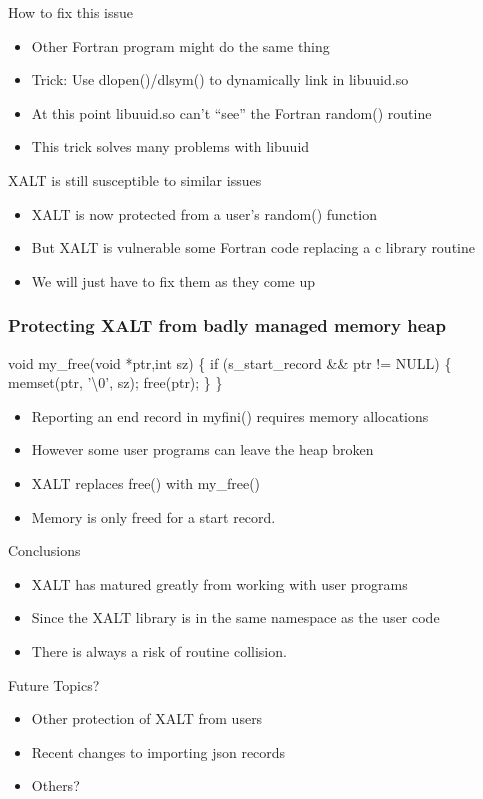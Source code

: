 \documentclass{beamer}
\begin{document}
\begin{frame}{How to fix this issue}
  \begin{itemize}
    \item Other Fortran program might do the same thing
    \item Trick: Use dlopen()/dlsym() to dynamically link in libuuid.so
    \item At this point libuuid.so can't ``see'' the Fortran random()
      routine
    \item This trick solves many problems with libuuid
  \end{itemize}
\end{frame}

\begin{frame}{XALT is still susceptible to similar issues}
  \begin{itemize}
    \item XALT is now protected from a user's random() function
    \item But XALT is vulnerable some Fortran code replacing a c
      library routine
    \item We will just have to fix them as they come up
  \end{itemize}
\end{frame}


\begin{frame}[fragile]
    \frametitle{Protecting XALT from badly managed memory heap}
 {\small
    \begin{semiverbatim}
void my\_free(void *ptr,int sz)
\{
  if (s\_start\_record \&\& ptr != NULL)
    \{
      memset(ptr, '\textbackslash{}0', sz);
      free(ptr);
    \}
\}
    \end{semiverbatim}
}
  \begin{itemize}
    \item Reporting an end record in myfini() requires memory
      allocations
    \item However some user programs can leave the heap broken
    \item XALT replaces free() with my\_free()
    \item Memory is only freed for a start record.
  \end{itemize}
\end{frame}

\begin{frame}{Conclusions}
  \begin{itemize}
    \item XALT has matured greatly from working with user programs
    \item Since the XALT library is in the same namespace as the user code 
    \item There is always a risk of routine collision.
  \end{itemize}
\end{frame}


\begin{frame}{Future Topics?}
  \begin{itemize}
    \item Other protection of XALT from users
    \item Recent changes to importing json records
    \item Others?
  \end{itemize}
\end{frame}
%

%
\end{document}
